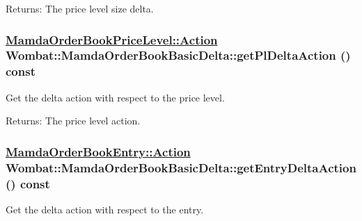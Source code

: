 \begin{Desc}
\item[Returns:]The price level size delta. \end{Desc}
\hypertarget{classWombat_1_1MamdaOrderBookBasicDelta_010b4c53083f76c3f10c5a33dd45cec8}{
\subsubsection[getPlDeltaAction]{\setlength{\rightskip}{0pt plus 5cm}\hyperlink{classWombat_1_1MamdaOrderBookPriceLevel_bd3407b4250fc6f7a42d94b6d32e358a}{Mamda\-Order\-Book\-Price\-Level::Action} Wombat::Mamda\-Order\-Book\-Basic\-Delta::get\-Pl\-Delta\-Action () const}}
\label{classWombat_1_1MamdaOrderBookBasicDelta_010b4c53083f76c3f10c5a33dd45cec8}


Get the delta action with respect to the price level. 

\begin{Desc}
\item[Returns:]The price level action. \end{Desc}
\hypertarget{classWombat_1_1MamdaOrderBookBasicDelta_54c664c4fa696cf6ae79f62db7d434da}{
\subsubsection[getEntryDeltaAction]{\setlength{\rightskip}{0pt plus 5cm}\hyperlink{classWombat_1_1MamdaOrderBookEntry_fc6cb1d67c7601d093a36f59cf9bcef4}{Mamda\-Order\-Book\-Entry::Action} Wombat::Mamda\-Order\-Book\-Basic\-Delta::get\-Entry\-Delta\-Action () const}}
\label{classWombat_1_1MamdaOrderBookBasicDelta_54c664c4fa696cf6ae79f62db7d434da}


Get the delta action with respect to the entry. 

